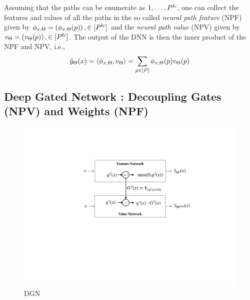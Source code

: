 \begin{proposition}
 Assuming that the paths can be enumerate as $1,\ldots, P^{\text{fc}}$, one can collect the features and values of all the paths in the so called \emph{neural path feature} (NPF) given by $\phi_{x,\Theta}=\left(\phi_{x,\Theta}(p)\right),\in[P^{\text{fc}}]$ and the \emph{neural path value} (NPV) given by $v_{\Theta}=\left(v_{\Theta}(p)\right),\in[P^{\text{fc}}]$. The output of the DNN is then the inner product of the NPF and NPV, i.e., 
\begin{align}
\hat{y}_{\Theta}(x)=\langle \phi_{x,\Theta},v_{\Theta}\rangle=\sum_{p\in[P]}  \phi_{x,\Theta}(p) v_{\Theta}(p)
\end{align}
\end{proposition}


\subsection{Deep Gated Network : Decoupling Gates (NPV) and Weights (NPF) }\label{sec:dgn}
\begin{figure}
\centering
\includegraphics[scale=0.25]{figs/dgn-nips.pdf}
\caption{DGN}
\label{fig:dgn}
\end{figure}

